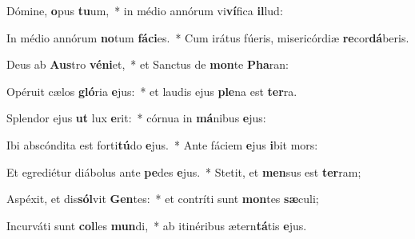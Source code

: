 \item Dómine, \textbf{o}pus \textbf{tu}um,~* in médio annórum vi\textbf{ví}fica \textbf{il}lud:
\item In médio annórum \textbf{no}tum \textbf{fá}\textbf{ci}es.~* Cum irátus fúeris, misericórdiæ \textbf{re}cor\textbf{dá}beris.
\item Deus ab \textbf{Aus}tro \textbf{vé}\textbf{ni}et,~* et Sanctus de \textbf{mon}te \textbf{Pha}ran:
\item Opéruit cælos \textbf{gló}ria \textbf{e}jus:~* et laudis ejus \textbf{ple}na est \textbf{ter}ra.
\item Splendor ejus \textbf{ut} lux \textbf{e}rit:~* córnua in \textbf{má}nibus \textbf{e}jus:
\item Ibi abscóndita est forti\textbf{tú}do \textbf{e}jus.~* Ante fáciem \textbf{e}jus \textbf{i}bit mors:
\item Et egrediétur diábolus ante \textbf{pe}des \textbf{e}jus.~* Stetit, et \textbf{men}sus est \textbf{ter}ram;
\item Aspéxit, et dis\textbf{sól}vit \textbf{Gen}tes:~* et contríti sunt \textbf{mon}tes \textbf{sæ}culi;
\item Incurváti sunt \textbf{col}les \textbf{mun}di,~* ab itinéribus ætern\textbf{tá}tis \textbf{e}jus.
